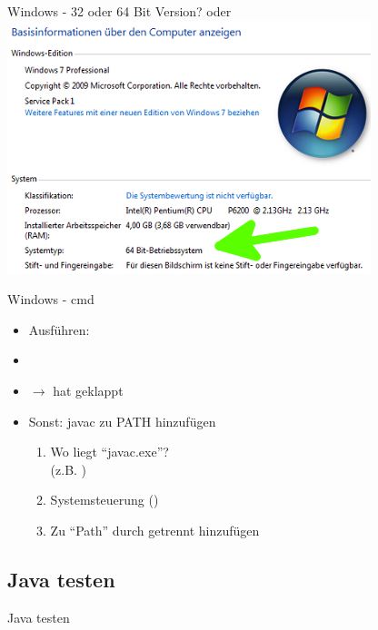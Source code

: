 \documentclass[usepdftitle=false,hyperref={pdfpagelabels=false}]{beamer}
\begin{document}
\begin{frame}{Windows - 32 oder 64 Bit Version?}
     oder 
    \includegraphics{windows-systemsteuerung.png}
\end{frame}

\begin{frame}{Windows - cmd}
    \begin{itemize}
        \item Ausführen: 
        \item {}
        \item {} $\rightarrow$ hat geklappt
        \item Sonst: javac zu PATH hinzufügen
            \begin{enumerate}
                \item Wo liegt "`javac.exe"'?\\(z.B. )
                \item Systemsteuerung ()\\
                \item Zu "`Path"' durch \myCode{;} getrennt hinzufügen
            \end{enumerate}
    \end{itemize}
\end{frame}

\subsection{Java testen}
\begin{frame}{Java testen}
    \inputminted[linenos, numbersep=5pt, tabsize=4, frame=lines, label=HelloWorld.java]{java}{HelloWorld.java}
    \inputminted[linenos=false]{console}{Bash.sh}
\end{frame}
\end{document}

